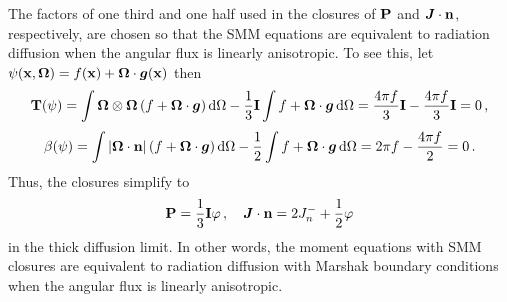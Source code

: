 \documentclass[../doc.tex]{subfiles}
\begin{document}
The factors of one third and one half used in the closures of $\P$ and $\vec{J}\cdot\n$, respectively, are chosen so that the SMM equations are equivalent to radiation diffusion when the angular flux is linearly anisotropic. To see this, let $\psi(\x,\Omegahat) = f(\x) + \Omegahat\cdot\vec{g}(\x)$ then 
	\begin{equation}
		\T(\psi) = \int \Omegahat\otimes\Omegahat\paren{f + \Omegahat\cdot\vec{g}} \ud \Omega - \frac{1}{3}\I \int f + \Omegahat\cdot\vec{g} \ud \Omega = \frac{4\pi f}{3} \I - \frac{4\pi f}{3} \I = 0 \,, 
	\end{equation}
	\begin{equation}
		\beta(\psi) = \int |\Omegahat\cdot\n|\paren{f + \Omegahat\cdot\vec{g}} \ud \Omega - \frac{1}{2}\int f + \Omegahat\cdot\vec{g} \ud \Omega = 2\pi f - \frac{4\pi f}{2} = 0 \,. 
	\end{equation}
Thus, the closures simplify to 
	\begin{equation}
		\P = \frac{1}{3}\I \varphi \,, \quad \vec{J}\cdot\n = 2 J_n^- + \frac{1}{2}\varphi 
	\end{equation}
in the thick diffusion limit. 
In other words, the moment equations with SMM closures are equivalent to radiation diffusion with Marshak boundary conditions when the angular flux is linearly anisotropic. 
\end{document}
